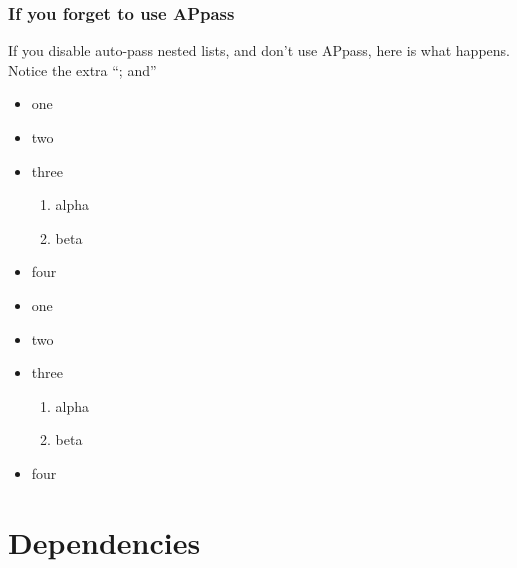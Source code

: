 \documentclass[11pt,parskip=half]{scrartcl}
\begin{document}
\subsubsection{If you forget to use APpass}
If you disable auto-pass nested lists, and don't use APpass, here is what happens. Notice the extra ``; and''
\begin{LTXexample}
\disableAPautopassnest
\begin{itemize}[autopunc]
    \item one
    \item two
    \item three
    \begin{enumerate}[autopunc]
        \item alpha
        \item beta
    \end{enumerate}
    \item four
\end{itemize}
\end{LTXexample}

\begin{LTXexample}
\enableAPautopassnest
\begin{itemize}[autopunc]
    \item one
    \item two
    \item three
    \begin{enumerate}
        \item alpha
        \item beta
    \end{enumerate}
    \item four
\end{itemize}
\end{LTXexample}


\section{Dependencies}
\end{document}
